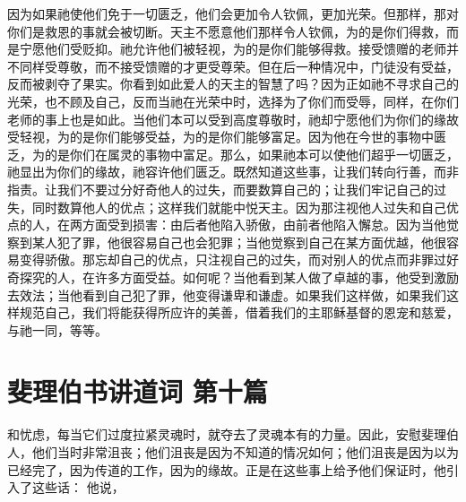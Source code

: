 因为如果祂使他们免于一切匮乏，他们会更加令人钦佩，更加光荣。但那样，那对你们是救恩的事就会被切断。天主不愿意他们那样令人钦佩，为的是你们得救，而是宁愿他们受贬抑。祂允许他们被轻视，为的是你们能够得救。接受馈赠的老师并不同样受尊敬，而不接受馈赠的才更受尊荣。但在后一种情况中，门徒没有受益，反而被剥夺了果实。你看到如此爱人的天主的智慧了吗？因为正如祂不寻求自己的光荣，也不顾及自己，反而当祂在光荣中时，选择为了你们而受辱，同样，在你们老师的事上也是如此。当他们本可以受到高度尊敬时，祂却宁愿他们为你们的缘故受轻视，为的是你们能够受益，为的是你们能够富足。因为他在今世的事物中匮乏，为的是你们在属灵的事物中富足。那么，如果祂本可以使他们超乎一切匮乏，祂显出为你们的缘故，祂容许他们匮乏。既然知道这些事，让我们转向行善，而非指责。让我们不要过分好奇他人的过失，而要数算自己的；让我们牢记自己的过失，同时数算他人的优点；这样我们就能中悦天主。因为那注视他人过失和自己优点的人，在两方面受到损害：由后者他陷入骄傲，由前者他陷入懈怠。因为当他觉察到某人犯了罪，他很容易自己也会犯罪；当他觉察到自己在某方面优越，他很容易变得骄傲。那忘却自己的优点，只注视自己的过失，而对别人的优点而非罪过好奇探究的人，在许多方面受益。如何呢？当他看到某人做了卓越的事，他受到激励去效法；当他看到自己犯了罪，他变得谦卑和谦虚。如果我们这样做，如果我们这样规范自己，我们将能获得所应许的美善，借着我们的主耶稣基督的恩宠和慈爱，与祂一同，等等。\par



\section{斐理伯书讲道词 第十篇}

\par

\par

和忧虑，每当它们过度拉紧灵魂时，就夺去了灵魂本有的力量。因此，安慰斐理伯人，他们当时非常沮丧；他们沮丧是因为不知道的情况如何；他们沮丧是因为以为已经完了，因为传道的工作，因为的缘故。正是在这些事上给予他们保证时，他引入了这些话： 他说，\par

